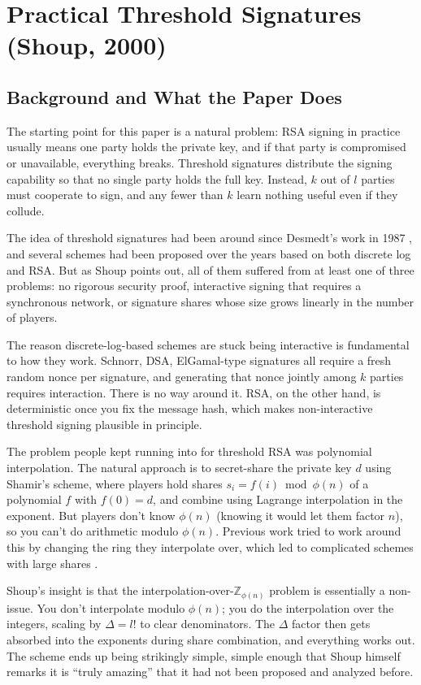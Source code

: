 \section{Practical Threshold Signatures (Shoup, 2000)}
\label{sec:paper1}

\subsection{Background and What the Paper Does}

The starting point for this paper is a natural problem: RSA signing in practice usually
means one party holds the private key, and if that party is compromised or unavailable,
everything breaks. Threshold signatures distribute the signing capability so that no
single party holds the full key. Instead, $k$ out of $l$ parties must cooperate to
sign, and any fewer than $k$ learn nothing useful even if they collude.

The idea of threshold signatures had been around since Desmedt's work in 1987
\cite{Des87}, and several schemes had been proposed over the years based on both discrete
log and RSA. But as Shoup points out, all of them suffered from at least one of three
problems: no rigorous security proof, interactive signing that requires a synchronous
network, or signature shares whose size grows linearly in the number of players.

The reason discrete-log-based schemes are stuck being interactive is fundamental to how
they work. Schnorr, DSA, ElGamal-type signatures all require a fresh random nonce per
signature, and generating that nonce jointly among $k$ parties requires interaction. There is no way around it. RSA, on the other hand, is deterministic once you fix the
message hash, which makes non-interactive threshold signing plausible in principle.

The problem people kept running into for threshold RSA was polynomial interpolation. The
natural approach is to secret-share the private key $d$ using Shamir's scheme, where
players hold shares $s_i = f(i) \bmod \phi(n)$ of a polynomial $f$ with $f(0) = d$, and
combine using Lagrange interpolation in the exponent. But players don't know $\phi(n)$
(knowing it would let them factor $n$), so you can't do arithmetic modulo $\phi(n)$.
Previous work tried to work around this by changing the ring they interpolate over, which
led to complicated schemes with large shares \cite{FD92, DDFY94}.

Shoup's insight is that the interpolation-over-$\mathbb{Z}_{\phi(n)}$ problem is
essentially a non-issue. You don't interpolate modulo $\phi(n)$; you do the interpolation
over the integers, scaling by $\Delta = l!$ to clear denominators. The $\Delta$ factor
then gets absorbed into the exponents during share combination, and everything works out.
The scheme ends up being strikingly simple, simple enough that Shoup himself remarks
it is ``truly amazing'' that it had not been proposed and analyzed before.


